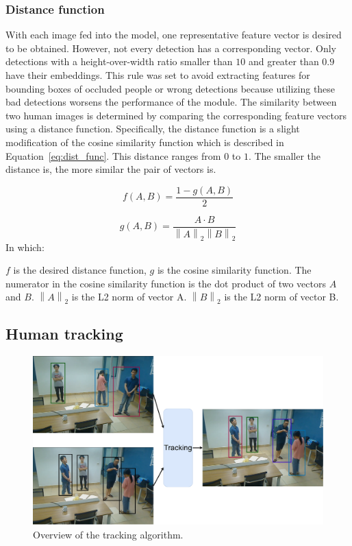 \documentclass[../main.tex]{subfiles}
\begin{document}
\subsubsection{Distance function}
With each image fed into the model, one representative feature vector is desired to be obtained. However, not every detection has a corresponding vector. Only detections with a height-over-width ratio smaller than $10$ and greater than $0.9$ have their embeddings. This rule was set to avoid extracting features for bounding boxes of occluded people or wrong detections because utilizing these bad detections worsens the performance of the module. The similarity between two human images is determined by comparing the corresponding feature vectors using a distance function. Specifically, the distance function is a slight modification of the cosine similarity function which is described in Equation~\ref{eq:dist_func}. This distance ranges from $0$ to $1$. The smaller the distance is, the more similar the pair of vectors is.

\begin{equation}\label{eq:dist_func}
    f(A, B) =  \dfrac {1 - g(A, B)} {2}
\end{equation}

\begin{equation}\label{eq:cosine}
    g(A, B) = \dfrac {A \cdot B} {\left\| A\right\| _{2}\left\| B\right\| _{2}}
\end{equation}
In which:
\begin{outline}
 \1 $f$ is the desired distance function, $g$ is the cosine similarity function.
 \1 The numerator in the cosine similarity function is the dot product of two vectors $A$ and $B$.
 \1 $\left\| A\right\| _{2}$ is the L2 norm of vector A.
 \1 $\left\| B\right\| _{2}$ is the L2 norm of vector B.
\end{outline}

\subsection{Human tracking}
\label{subsec:hutrack}

\begin{figure}[h!]
\centering
\includegraphics[width=\linewidth]{Figure/track_flow.pdf}
\caption{Overview of the tracking algorithm.}
\label{fig:track}
\end{figure}
\end{document}
